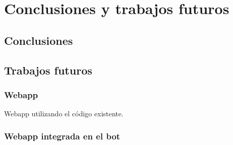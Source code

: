 \chapter{Conclusiones y trabajos futuros}

\section{Conclusiones}


\section{Trabajos futuros}

\subsection{Webapp}
Webapp utilizando el código existente.

\subsection{Webapp integrada en el bot}
